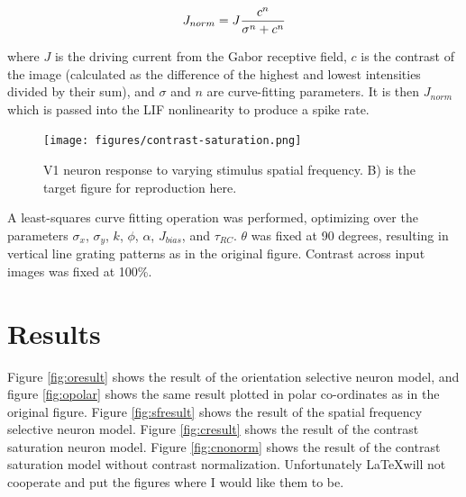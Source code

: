 \documentclass{article}
\begin{document}
\begin{equation}
J_{norm} = J { c^n \over \sigma^n + c^n}
\end{equation}

where $J$ is the driving current from the Gabor receptive field, $c$ is the contrast of the image (calculated as the difference of the highest and lowest intensities divided by their sum), and $\sigma$ and $n$ are curve-fitting parameters. It is then $J_{norm}$ which is passed into the LIF nonlinearity to produce a spike rate. 

\begin{figure}[h]
\begin{center}
\texttt{[image: figures/contrast-saturation.png]}
\caption{ V1 neuron response to varying stimulus spatial frequency. B) is the target figure for reproduction here. \cite{carandini97}}
\label{fig:con_saturation}
\end{center}
\end{figure}

A least-squares curve fitting operation was performed, optimizing over the parameters $\sigma_x$, $\sigma_y$, $k$, $\phi$, $\alpha$, $J_{bias}$, and $\tau_{RC}$. $\theta$ was fixed at 90 degrees, resulting in vertical line grating patterns as in the original figure. Contrast across input images was fixed at 100\%.

\section{Results}
Figure \ref{fig:oresult} shows the result of the orientation selective neuron model, and figure \ref{fig:opolar} shows the same result plotted in polar co-ordinates as in the original figure. Figure \ref{fig:sfresult} shows the result of the spatial frequency selective neuron model. Figure \ref{fig:cresult} shows the result of the contrast saturation neuron model. Figure \ref{fig:cnonorm} shows the result of the contrast saturation model without contrast normalization. Unfortunately \LaTeX will not cooperate and put the figures where I would like them to be. 
\end{document}

